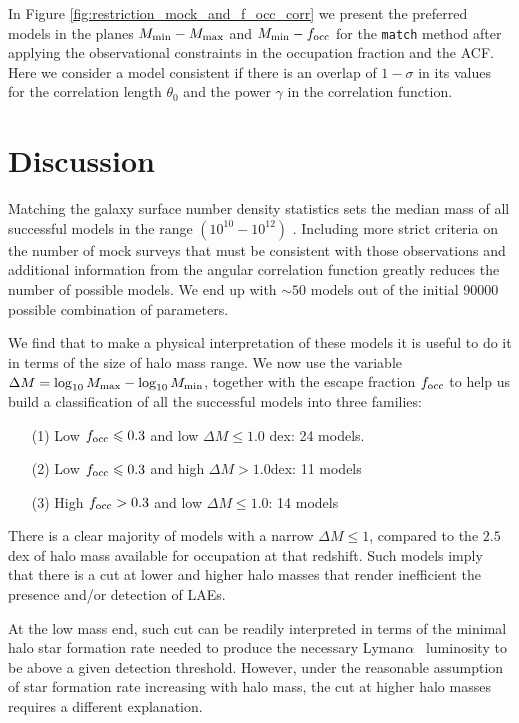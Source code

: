 \documentclass[usenatbib]{mn2e}
\newcommand{\hMsun}{{\ifmmode{h^{-1}{\rm
        {M_{\odot}}}}\else{$h^{-1}{\rm{M_{\odot}}}$}\fi}}
\newcommand{\lya}{{Lyman$\alpha$~}}
\begin{document}
In Figure \ref{fig:restriction_mock_and_f_occ_corr} we present the preferred
models in the planes $M_{\rm min}-M_{\rm  max}$ and $M_{\rm min}-f_{\rm occ}$
for the {\tt match} method after applying the observational constraints 
in the occupation fraction and the ACF. Here we consider a model
consistent if there is an overlap of $1-\sigma$ in its values for the
correlation length $\theta_0$ and the power $\gamma$ in the
correlation function.  


\section{Discussion}

Matching the galaxy surface number density statistics sets the median
mass of all successful models in the range $(10^{10}-10^{12})$
\hMsun. Including more strict criteria on the number of mock surveys
that must be consistent with those observations and additional
information from the angular correlation function greatly reduces the
number of possible models. We end up with $\sim 50$ models out of the
initial 90000 possible combination of parameters.  

We find that to make a physical interpretation of these models it is
useful to do it in terms of the size of halo mass range. We now use the
variable $\Delta M=\log_{10}M_{\rm max} - \log_{10}M_{\rm  min}$, together
with the escape fraction $f_{\rm occ}$ to help us build a classification
of all the successful models into three families: 


\begin{itemize}
\item[(1)] Low $f_{\rm occ}\leq 0.3$ and low $\Delta M\leq 1.0$
  dex: 24 models.
\item[(2)] Low $f_{\rm occ}\leq 0.3$ and high $\Delta M > 1.0$dex: 11
  models
\item[(3)] High $f_{\rm occ}> 0.3$ and low $\Delta M\leq 1.0$: 14 models
\end{itemize}

There is a clear majority of models with a narrow $\Delta M\leq
1$, compared to the $2.5$dex of halo mass available for occupation at
that redshift. Such models imply that there is a cut at lower and higher halo
masses that render inefficient the presence and/or detection of LAEs.

At the low mass end, such cut can be readily interpreted in terms of the
minimal halo star formation rate needed to produce the necessary \lya
luminosity to be above a given detection threshold.  However, under
the reasonable assumption of star formation rate increasing with halo
mass, the cut at higher halo masses requires a different explanation. 
\end{document}
